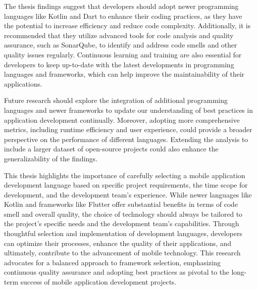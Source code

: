 \par
The thesis findings suggest that developers should adopt newer programming languages like Kotlin and Dart to enhance their coding practices, as they have the potential to increase efficiency and reduce code complexity. Additionally, it is recommended that they utilize advanced tools for code analysis and quality assurance, such as SonarQube, to identify and address code smells and other quality issues regularly. Continuous learning and training are also essential for developers to keep up-to-date with the latest developments in programming languages and frameworks, which can help improve the maintainability of their applications.
\par
Future research should explore the integration of additional programming languages and newer frameworks to update our understanding of best practices in application development continually. Moreover, adopting more comprehensive metrics, including runtime efficiency and user experience, could provide a broader perspective on the performance of different languages. Extending the analysis to include a larger dataset of open-source projects could also enhance the generalizability of the findings.
\par
This thesis highlights the importance of carefully selecting a mobile application development language based on specific project requirements, the time scope for development, and the development team’s experience. While newer languages like Kotlin and frameworks like Flutter offer substantial benefits in terms of code smell and overall quality, the choice of technology should always be tailored to the project's specific needs and the development team's capabilities. Through thoughtful selection and implementation of development languages, developers can optimize their processes, enhance the quality of their applications, and ultimately, contribute to the advancement of mobile technology. This research advocates for a balanced approach to framework selection, emphasizing continuous quality assurance and adopting best practices as pivotal to the long-term success of mobile application development projects.
